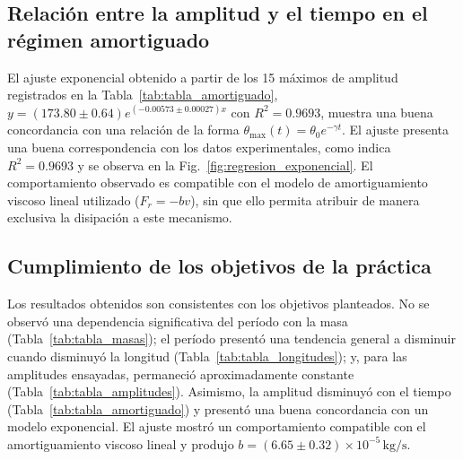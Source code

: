 \subsection{Relación entre la amplitud y el tiempo en el régimen amortiguado}
El ajuste exponencial obtenido a partir de los 15 máximos de amplitud registrados en la Tabla~\ref{tab:tabla_amortiguado}, $y=(173.80\pm0.64)e^{(-0.00573\pm0.00027)x}$ con $R^2=0.9693$, muestra una buena concordancia con una relación de la forma $\theta_{\max}(t)=\theta_0e^{-\gamma t}$. El ajuste presenta una buena correspondencia con los datos experimentales, como indica $R^2=0.9693$ y se observa en la Fig.~\ref{fig:regresion_exponencial}. El comportamiento observado es compatible con el modelo de amortiguamiento viscoso lineal utilizado ($F_r=-bv$), sin que ello permita atribuir de manera exclusiva la disipación a este mecanismo.

\subsection{Cumplimiento de los objetivos de la práctica}
Los resultados obtenidos son consistentes con los objetivos planteados. No se observó una dependencia significativa del período con la masa (Tabla~\ref{tab:tabla_masas}); el período presentó una tendencia general a disminuir cuando disminuyó la longitud (Tabla~\ref{tab:tabla_longitudes}); y, para las amplitudes ensayadas, permaneció aproximadamente constante (Tabla~\ref{tab:tabla_amplitudes}). Asimismo, la amplitud disminuyó con el tiempo (Tabla~\ref{tab:tabla_amortiguado}) y presentó una buena concordancia con un modelo exponencial. El ajuste mostró un comportamiento compatible con el amortiguamiento viscoso lineal y produjo $b=(6.65\pm0.32)\times10^{-5}\,\mathrm{kg/s}$.
